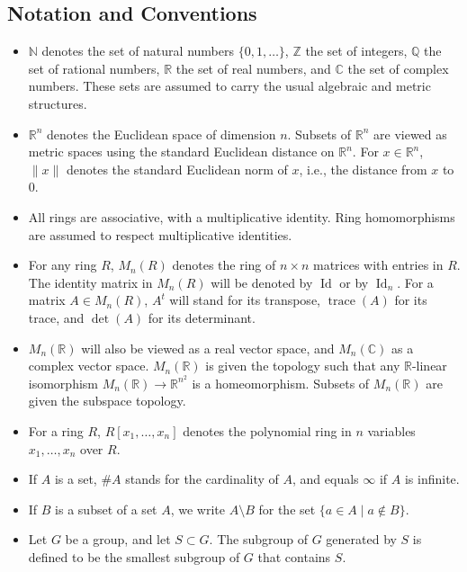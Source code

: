 \documentclass[11pt, a4paper]{article}
\begin{document}
\subsection*{Notation and Conventions}
\begin{itemize}
  \item $\mathbb{N}$ denotes the set of natural numbers $\{0, 1, \dots\}$, $\mathbb{Z}$ the set of integers, $\mathbb{Q}$ the set of rational numbers, $\mathbb{R}$ the set of real numbers, and $\mathbb{C}$ the set of complex numbers. These sets are assumed to carry the usual algebraic and metric structures.
  \item $\mathbb{R}^n$ denotes the Euclidean space of dimension $n$. Subsets of $\mathbb{R}^n$ are viewed as metric spaces using the standard Euclidean distance on $\mathbb{R}^n$. For $x \in \mathbb{R}^n$, $\|x\|$ denotes the standard Euclidean norm of $x$, i.e., the distance from $x$ to $0$.
  \item All rings are associative, with a multiplicative identity. Ring homomorphisms are assumed to respect multiplicative identities.
  \item For any ring $R$, $M_n(R)$ denotes the ring of $n \times n$ matrices with entries in $R$. The identity matrix in $M_n(R)$ will be denoted by $\operatorname{Id}$ or by $\operatorname{Id}_n$. For a matrix $A \in M_n(R)$, $A^t$ will stand for its transpose, $\operatorname{trace}(A)$ for its trace, and $\det(A)$ for its determinant.
  \item $M_n(\mathbb{R})$ will also be viewed as a real vector space, and $M_n(\mathbb{C})$ as a complex vector space. $M_n(\mathbb{R})$ is given the topology such that any $\mathbb{R}$-linear isomorphism $M_n(\mathbb{R}) \to \mathbb{R}^{n^2}$ is a homeomorphism. Subsets of $M_n(\mathbb{R})$ are given the subspace topology.
  \item For a ring $R$, $R[x_1, \dots, x_n]$ denotes the polynomial ring in $n$ variables $x_1, \dots, x_n$ over $R$.
  \item If $A$ is a set, $\#A$ stands for the cardinality of $A$, and equals $\infty$ if $A$ is infinite.
  \item If $B$ is a subset of a set $A$, we write $A \setminus B$ for the set $\{a \in A \mid a \notin B\}$.
  \item Let $G$ be a group, and let $S \subset G$. The subgroup of $G$ generated by $S$ is defined to be the smallest subgroup of $G$ that contains $S$.
\end{itemize}
\end{document}
